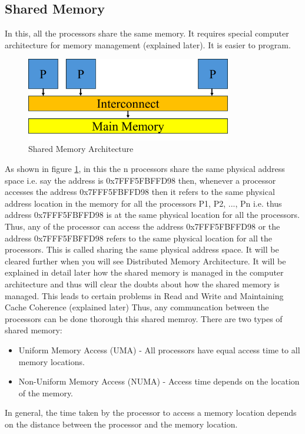 \documentclass[12pt]{article}
\begin{document}
\subsection{Shared Memory}
In this, all the processors share the same memory. It requires special computer architecture for memory management (explained later). 
It is easier to program.
\begin{figure}[H]
    \centering
    \includegraphics[width=0.8\textwidth]{images/shared_memory.png}
    \caption{Shared Memory Architecture}
    \label{fig:shared_memory}
\end{figure}
As shown in figure \ref{fig:shared_memory}, in this the n processors share the same physical address space i.e.
say the address is 0x7FFF5FBFFD98 then, whenever a processor accesses the address 0x7FFF5FBFFD98 then it refers to the same physical address location in the memory 
for all the processors P1, P2, ..., Pn i.e. thus address 0x7FFF5FBFFD98 is at the same physical location for
all the processors. Thus, any of the processor can access the address 0x7FFF5FBFFD98 or the address 0x7FFF5FBFFD98 refers to the 
same physical location for all the processors. This is called sharing the same physical address space.
It will be cleared further when you will see Distributed Memory Architecture.
It will be explained in detail later how the shared memory is managed in the computer architecture and thus will clear the doubts about how the shared memory is managed. 
This leads to certain problems in Read and Write and Maintaining Cache Coherence (explained later)
Thus, any communcation between the processors can be done thorough this shared memroy. 
There are two types of shared memory:
\begin{itemize}
    \item Uniform Memory Access (UMA) - All processors have equal access time to all memory locations.
    \item Non-Uniform Memory Access (NUMA) - Access time depends on the location of the memory.
\end{itemize}
In general, the time taken by the processor to access a memory location depends on the 
distance between the processor and the memory location.
\end{document}

